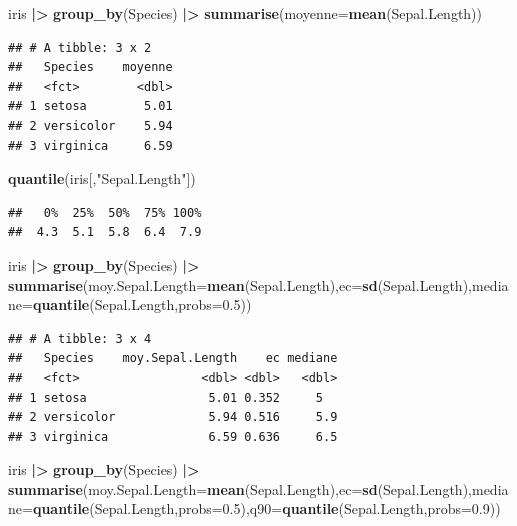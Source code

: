 \documentclass[
]{book}
\newenvironment{Shaded}{\begin{snugshade}}{\end{snugshade}}
\newcommand{\AttributeTok}[1]{\textcolor[rgb]{0.13,0.29,0.53}{#1}}
\newcommand{\FloatTok}[1]{\textcolor[rgb]{0.00,0.00,0.81}{#1}}
\newcommand{\FunctionTok}[1]{\textcolor[rgb]{0.13,0.29,0.53}{\textbf{#1}}}
\newcommand{\NormalTok}[1]{#1}
\newcommand{\SpecialCharTok}[1]{\textcolor[rgb]{0.81,0.36,0.00}{\textbf{#1}}}
\newcommand{\StringTok}[1]{\textcolor[rgb]{0.31,0.60,0.02}{#1}}
\begin{document}
\begin{Shaded}
\begin{Highlighting}[]
\NormalTok{iris }\SpecialCharTok{|\textgreater{}} \FunctionTok{group\_by}\NormalTok{(Species) }\SpecialCharTok{|\textgreater{}} \FunctionTok{summarise}\NormalTok{(}\AttributeTok{moyenne=}\FunctionTok{mean}\NormalTok{(Sepal.Length))}
\end{Highlighting}
\end{Shaded}

\begin{verbatim}
## # A tibble: 3 x 2
##   Species    moyenne
##   <fct>        <dbl>
## 1 setosa        5.01
## 2 versicolor    5.94
## 3 virginica     6.59
\end{verbatim}

\begin{Shaded}
\begin{Highlighting}[]
\FunctionTok{quantile}\NormalTok{(iris[,}\StringTok{"Sepal.Length"}\NormalTok{])}
\end{Highlighting}
\end{Shaded}

\begin{verbatim}
##   0%  25%  50%  75% 100% 
##  4.3  5.1  5.8  6.4  7.9
\end{verbatim}

\begin{Shaded}
\begin{Highlighting}[]
\NormalTok{iris }\SpecialCharTok{|\textgreater{}} \FunctionTok{group\_by}\NormalTok{(Species) }\SpecialCharTok{|\textgreater{}} \FunctionTok{summarise}\NormalTok{(}\AttributeTok{moy.Sepal.Length=}\FunctionTok{mean}\NormalTok{(Sepal.Length),}\AttributeTok{ec=}\FunctionTok{sd}\NormalTok{(Sepal.Length),}\AttributeTok{mediane=}\FunctionTok{quantile}\NormalTok{(Sepal.Length,}\AttributeTok{probs=}\FloatTok{0.5}\NormalTok{))}
\end{Highlighting}
\end{Shaded}

\begin{verbatim}
## # A tibble: 3 x 4
##   Species    moy.Sepal.Length    ec mediane
##   <fct>                 <dbl> <dbl>   <dbl>
## 1 setosa                 5.01 0.352     5  
## 2 versicolor             5.94 0.516     5.9
## 3 virginica              6.59 0.636     6.5
\end{verbatim}

\begin{Shaded}
\begin{Highlighting}[]
\NormalTok{iris }\SpecialCharTok{|\textgreater{}} \FunctionTok{group\_by}\NormalTok{(Species) }\SpecialCharTok{|\textgreater{}} \FunctionTok{summarise}\NormalTok{(}\AttributeTok{moy.Sepal.Length=}\FunctionTok{mean}\NormalTok{(Sepal.Length),}\AttributeTok{ec=}\FunctionTok{sd}\NormalTok{(Sepal.Length),}\AttributeTok{mediane=}\FunctionTok{quantile}\NormalTok{(Sepal.Length,}\AttributeTok{probs=}\FloatTok{0.5}\NormalTok{),}\AttributeTok{q90=}\FunctionTok{quantile}\NormalTok{(Sepal.Length,}\AttributeTok{probs=}\FloatTok{0.9}\NormalTok{))}
\end{Highlighting}
\end{Shaded}
\end{document}

